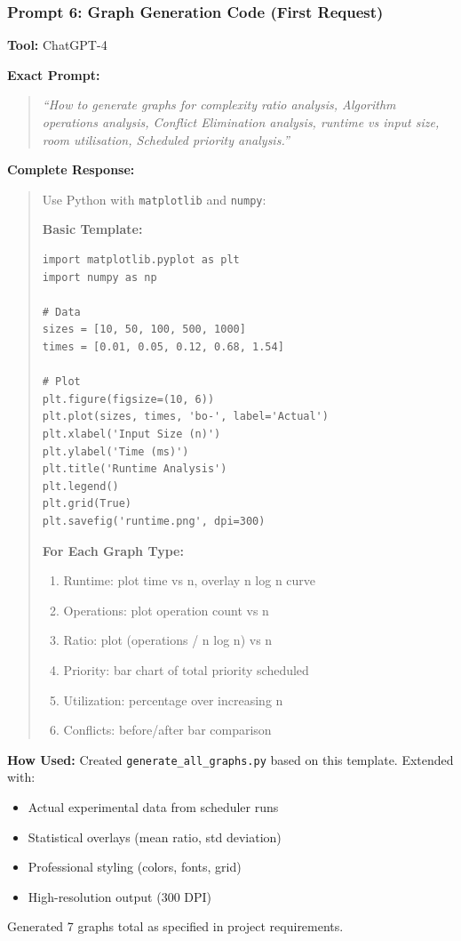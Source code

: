 \documentclass[conference]{IEEEtran}
\begin{document}
\vspace{0.4cm}

\subsubsection{Prompt 6: Graph Generation Code (First Request)}

\textbf{Tool:} ChatGPT-4

\textbf{Exact Prompt:}
\begin{quote}
\textit{``How to generate graphs for complexity ratio analysis, Algorithm operations analysis, Conflict Elimination analysis, runtime vs input size, room utilisation, Scheduled priority analysis.''}
\end{quote}

\textbf{Complete Response:}
\begin{quote}
\small
Use Python with \texttt{matplotlib} and \texttt{numpy}:

\textbf{Basic Template:}
\begin{verbatim}
import matplotlib.pyplot as plt
import numpy as np

# Data
sizes = [10, 50, 100, 500, 1000]
times = [0.01, 0.05, 0.12, 0.68, 1.54]

# Plot
plt.figure(figsize=(10, 6))
plt.plot(sizes, times, 'bo-', label='Actual')
plt.xlabel('Input Size (n)')
plt.ylabel('Time (ms)')
plt.title('Runtime Analysis')
plt.legend()
plt.grid(True)
plt.savefig('runtime.png', dpi=300)
\end{verbatim}

\textbf{For Each Graph Type:}
\begin{enumerate}
    \item Runtime: plot time vs n, overlay n log n curve
    \item Operations: plot operation count vs n
    \item Ratio: plot (operations / n log n) vs n
    \item Priority: bar chart of total priority scheduled
    \item Utilization: percentage over increasing n
    \item Conflicts: before/after bar comparison
\end{enumerate}
\end{quote}

\textbf{How Used:}
Created \texttt{generate\_all\_graphs.py} based on this template. Extended with:
\begin{itemize}
    \item Actual experimental data from scheduler runs
    \item Statistical overlays (mean ratio, std deviation)
    \item Professional styling (colors, fonts, grid)
    \item High-resolution output (300 DPI)
\end{itemize}
Generated 7 graphs total as specified in project requirements.
\end{document}
